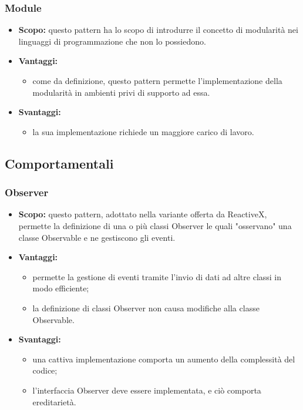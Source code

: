 	 \subsubsection{Module}
      \begin{itemize}
       \item \textbf{Scopo:} questo pattern ha lo scopo di introdurre il concetto di modularità nei linguaggi di programmazione che non lo possiedono.
	\item \textbf{Vantaggi:}
	  \begin{itemize}
	   \item come da definizione, questo pattern permette l'implementazione della modularità in ambienti privi di supporto ad essa.
	  \end{itemize}
	\item \textbf{Svantaggi:}
	  \begin{itemize}
	   \item la sua implementazione richiede un maggiore carico di lavoro.
	  \end{itemize}
	\end{itemize}
	  \newpage
  \subsection{Comportamentali}
    \subsubsection{Observer}
      \begin{itemize}
       \item \textbf{Scopo:} questo pattern, adottato nella variante offerta da ReactiveX, permette la definizione di una o più classi Observer le quali "osservano" una classe Observable e ne gestiscono gli eventi.
	\item \textbf{Vantaggi:}
	  \begin{itemize}
	   \item permette la gestione di eventi tramite l'invio di dati ad altre classi in modo efficiente;
	   \item la definizione di classi Observer non causa modifiche alla classe Observable. 
	  \end{itemize}
	\item \textbf{Svantaggi:}
	  \begin{itemize}
	   \item una cattiva implementazione comporta un aumento della complessità del codice;
	   \item l'interfaccia Observer deve essere implementata, e ciò comporta ereditarietà.
	  \end{itemize}
	\end{itemize}
	
